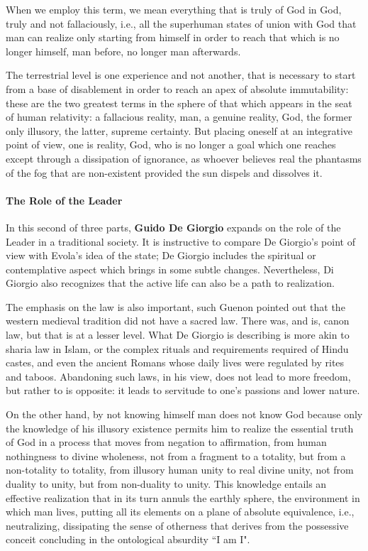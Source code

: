 When we employ this term, we mean everything that is truly of God in God, truly and not fallaciously, i.e., all the superhuman states of union with God that man can realize only starting from himself in order to reach that which is no longer himself, man before, no longer man afterwards.

The terrestrial level is one experience and not another, that is necessary to start from a base of disablement in order to reach an apex of absolute immutability: these are the two greatest terms in the sphere of that which appears in the seat of human relativity: a fallacious reality, man, a genuine reality, God, the former only illusory, the latter, supreme certainty. But placing oneself at an integrative point of view, one is reality, God, who is no longer a goal which one reaches except through a dissipation of ignorance, as whoever believes real the phantasms of the fog that are non-existent provided the sun dispels and dissolves it.

\paragraph{The Role of the Leader}

\begin{quotex}
In this second of three parts, \textbf{Guido De Giorgio} expands on the role of the Leader in a traditional society. It is instructive to compare De Giorgio's point of view with Evola's idea of the state; De Giorgio includes the spiritual or contemplative aspect which brings in some subtle changes. Nevertheless, Di Giorgio also recognizes that the active life can also be a path to realization.

The emphasis on the law is also important, such Guenon pointed out that the western medieval tradition did not have a sacred law. There was, and is, canon law, but that is at a lesser level. What De Giorgio is describing is more akin to sharia law in Islam, or the complex rituals and requirements required of Hindu castes, and even the ancient Romans whose daily lives were regulated by rites and taboos. Abandoning such laws, in his view, does not lead to more freedom, but rather to is opposite: it leads to servitude to one's passions and lower nature. 

\end{quotex}
On the other hand, by not knowing himself man does not know God because only the knowledge of his illusory existence permits him to realize the essential truth of God in a process that moves from negation to affirmation, from human nothingness to divine wholeness, not from a fragment to a totality, but from a non-totality to totality, from illusory human unity to real divine unity, not from duality to unity, but from non-duality to unity. This knowledge entails an effective realization that in its turn annuls the earthly sphere, the environment in which man lives, putting all its elements on a plane of absolute equivalence, i.e., neutralizing, dissipating the sense of otherness that derives from the possessive conceit concluding in the ontological absurdity ``I am I".

